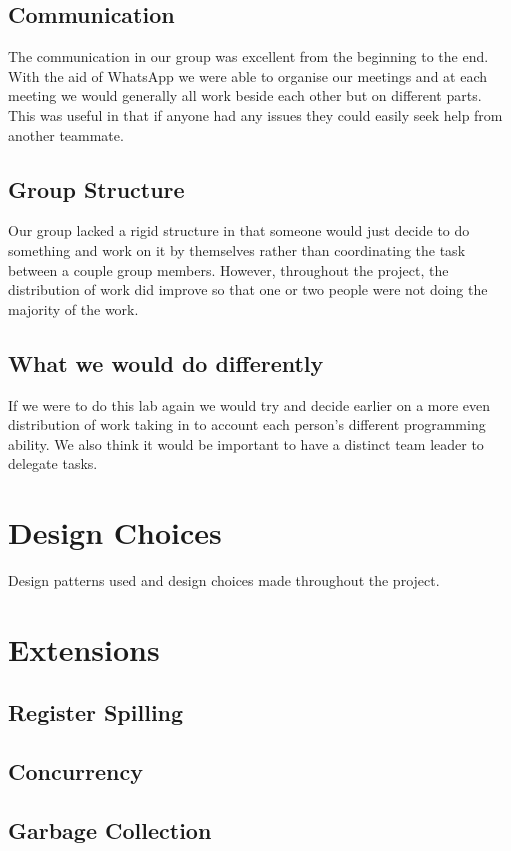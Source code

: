 \documentclass{article}
\begin{document}
\subsection{Communication}
The communication in our group was excellent from the beginning to the end. With the aid of WhatsApp we were able to organise our meetings and at each meeting we would generally all work beside each other but on different parts. This was useful in that if anyone had any issues they could easily seek help from another teammate. 

\subsection{Group Structure}
Our group lacked a rigid structure in that someone would just decide to do something and work on it by themselves rather than coordinating the task between a couple group members. However, throughout the project, the distribution of work did improve so that one or two people were not doing the majority of the work.

\subsection{What we would do differently}
If we were to do this lab again we would try and decide earlier on a more even distribution of work taking in to account each person's different programming ability. We also think it would be important to have a distinct team leader to delegate tasks.

\section{Design Choices}
Design patterns used and design choices made throughout the project.

\section{Extensions}
\subsection{Register Spilling}
\subsection{Concurrency}
\subsection{Garbage Collection}
\end{document}
